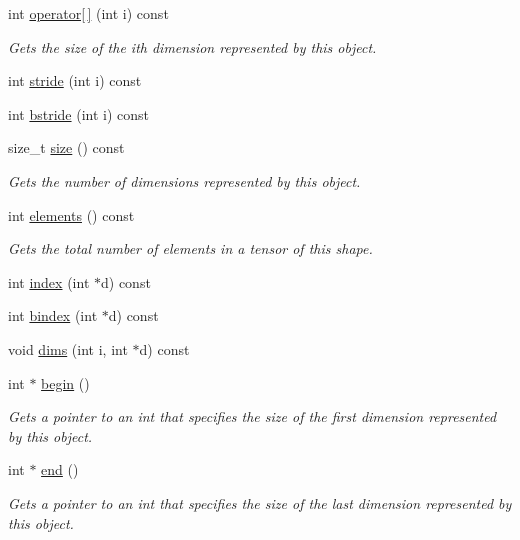 \begin{DoxyCompactItemize}
int \hyperlink{structmarian_1_1Shape_ac6532138e02276d3a79bad788ca7e00b}{operator\mbox{[}$\,$\mbox{]}} (int i) const 
\begin{DoxyCompactList}\small\item\em Gets the size of the {\ttfamily i}th dimension represented by this object. \end{DoxyCompactList}\item 
int \hyperlink{structmarian_1_1Shape_aca536a163ca8729bd0703250a0f83aa8}{stride} (int i) const 
\item 
int \hyperlink{structmarian_1_1Shape_a1d256f7b75335696bf3dec9368a718b2}{bstride} (int i) const 
\item 
size\+\_\+t \hyperlink{structmarian_1_1Shape_ad44c5095408e203526566bc8b7c20a4b}{size} () const 
\begin{DoxyCompactList}\small\item\em Gets the number of dimensions represented by this object. \end{DoxyCompactList}\item 
int \hyperlink{structmarian_1_1Shape_ac5b429b8024a6de2e2b4c089757f398f}{elements} () const 
\begin{DoxyCompactList}\small\item\em Gets the total number of elements in a tensor of this shape. \end{DoxyCompactList}\item 
int \hyperlink{structmarian_1_1Shape_a6fd892ce40df247ae6e8631061cd182f}{index} (int $\ast$d) const 
\item 
int \hyperlink{structmarian_1_1Shape_a323033b473c9563967559bbd2def9f3c}{bindex} (int $\ast$d) const 
\item 
void \hyperlink{structmarian_1_1Shape_afe51de9add418af661585454ff3ed30b}{dims} (int i, int $\ast$d) const 
\item 
int $\ast$ \hyperlink{structmarian_1_1Shape_aec078a9049c1007834e21090a0fcd057}{begin} ()
\begin{DoxyCompactList}\small\item\em Gets a pointer to an int that specifies the size of the first dimension represented by this object. \end{DoxyCompactList}\item 
int $\ast$ \hyperlink{structmarian_1_1Shape_ac024a9b46f6a11c46019cd9a5daad0cd}{end} ()
\begin{DoxyCompactList}\small\item\em Gets a pointer to an int that specifies the size of the last dimension represented by this object. \end{DoxyCompactList}\item 

\end{DoxyCompactItemize}
